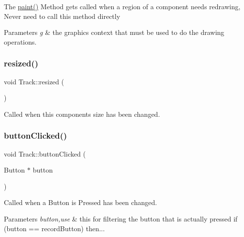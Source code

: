 The \mbox{\hyperlink{class_track_a8ad88c68d4c7608f89f84ece5e06881e}{paint()}} Method gets called when a region of a component needs redrawing, Never need to call this method directly


\begin{DoxyParams}{Parameters}
{\em g} & the graphics context that must be used to do the drawing operations. \\
\hline
\end{DoxyParams}
\mbox{\label{class_track_a64ce8e4f98a9a9b84d42bd77d869366b}} 
\subsubsection{\texorpdfstring{resized()}{resized()}}
{\footnotesize\ttfamily void Track\+::resized (\begin{DoxyParamCaption}{ }\end{DoxyParamCaption})\hspace{0.3cm}{\ttfamily [override]}}

Called when this component\textquotesingle{}s size has been changed. \mbox{\label{class_track_acc9d4ec238e6cbfa01cb1b656dd842d9}} 
\subsubsection{\texorpdfstring{buttonClicked()}{buttonClicked()}}
{\footnotesize\ttfamily void Track\+::button\+Clicked (\begin{DoxyParamCaption}\item[{Button $\ast$}]{button }\end{DoxyParamCaption})\hspace{0.3cm}{\ttfamily [override]}}

Called when a Button is Pressed has been changed. 
\begin{DoxyParams}{Parameters}
{\em button,use} & this for filtering the button that is actually pressed if (button == record\+Button) then... \\
\hline
\end{DoxyParams}
\mbox{\label{class_track_aa79209142c2fc3321441f2eb04f17ba2}} 
